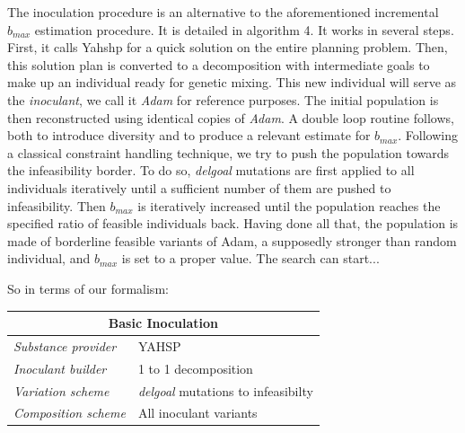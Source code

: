 \documentclass[english]{DESCARWINreport}
\begin{document}
The inoculation procedure is an alternative to the aforementioned incremental {$b_{max}$} estimation procedure. It is detailed in algorithm 4. It works in several steps. First, it calls Yahshp for a quick solution on the entire planning problem. Then, this solution plan is converted to a decomposition with intermediate goals to make up an individual ready for genetic mixing. This new individual will serve as the \emph{inoculant}, we call it \emph{Adam} for reference purposes. The initial population is then reconstructed using identical copies of \emph{Adam}. A double loop routine follows, both to introduce diversity and to produce a relevant estimate for {$b_{max}$}. Following a classical constraint handling technique, we try to push the population towards the infeasibility border. To do so, \emph{delgoal} mutations are first applied to all individuals iteratively until a sufficient number of them are pushed to infeasibility. Then {$b_{max}$} is iteratively increased until the population reaches the specified ratio of feasible individuals back. Having done all that, the population is made of borderline feasible variants of Adam, a supposedly stronger than random individual, and {$b_{max}$} is set to a proper value. The search can start...

So in terms of our formalism:

\begin{center}
\begin{tabular}{|l|l|}
  \hline
  \multicolumn{2}{|c|}{\bf Basic Inoculation} \\
  \hline
  \emph{Substance provider} & YAHSP \\
  \emph{Inoculant builder} & 1 to 1 decomposition \\
	\emph{Variation scheme} & \emph{delgoal} mutations to infeasibilty \\
	\emph{Composition scheme} & All inoculant variants \\
  \hline
\end{tabular}
\end{center}

\begin{algorithm}[h!]
\caption{$estimate b_{max} incremental$}
{\small
\begin{algorithmic}[1]


\ENDIF
\ENDFOR
{}
\ENDWHILE

\end{algorithmic}
}
\end{algorithm}
\end{document}
